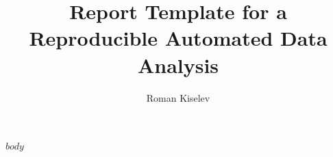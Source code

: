 \documentclass[a4paper]{scrartcl}
\title{Report Template for a Reproducible Automated Data Analysis}
\author{Roman Kiselev}
\begin{document}
    \maketitle

    $body$

    
    
\end{document}
